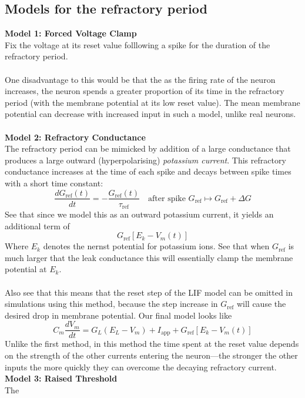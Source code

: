\documentclass{report}
\begin{document}
\subsection{Models for the refractory period}
\textbf{Model 1: Forced Voltage Clamp}\\
Fix the voltage at its reset value folllowing a spike for the duration of the refractory period.\\
\vspace{1mm}\\
One disadvantage to this would be that the as the firing rate of the neuron increases, the neuron spends a greater proportion of its time in the refractory period 
(with the membrane potential at its low reset value). The mean membrane potential can decrease with increased input in such a model, unlike real neurons.\\
\vspace{1mm}\\
\textbf{Model 2: Refractory Conductance}\\
The refractory period can be mimicked by addition of a large conductance that produces a large outward (hyperpolarising) \textit{potassium current}. This refractory
conductance increases at the time of each spike and decays between spike times with a short time constant:
\begin{equation*}
\frac{dG_{\text{ref}}(t)}{dt}=-\frac{G_{\text{ref}}(t)}{\tau_{\text{ref}}}\quad\text{after spike }G_{\text{ref}}\mapsto G_{\text{ref}}+\Delta G
\end{equation*}
See that since we model this as an outward potassium current, it yields an additional term of
\begin{equation*}
G_{\text{ref}}[E_k-V_m(t)]
\end{equation*}
Where $E_k$ denotes the nernst potential for potassium ions. See that when $G_{\text{ref}}$ is much larger that the leak conductance this will essentially clamp the membrane
potential at $E_k$.\\
\vspace{1mm}\\
Also see that this means that the reset step of the LIF model can be omitted in simulations using this method, because the step increase in $G_{\text{ref}}$ will cause the 
desired drop in membrane potential.
Our final model looks like
\begin{equation*}
C_m\frac{dV_m}{dt}=G_L(E_L-V_m)+I_\text{app}+G_{\text{ref}}[E_k-V_m(t)]
\end{equation*}
Unlike the first method, in this method the time spent at the reset value depends on the strength of the other currents entering the neuron---the stronger the other inputs the more quickly they can overcome the decaying refractory current.
\newpage
\noindent\textbf{Model 3: Raised Threshold}\\
The
\end{document}
